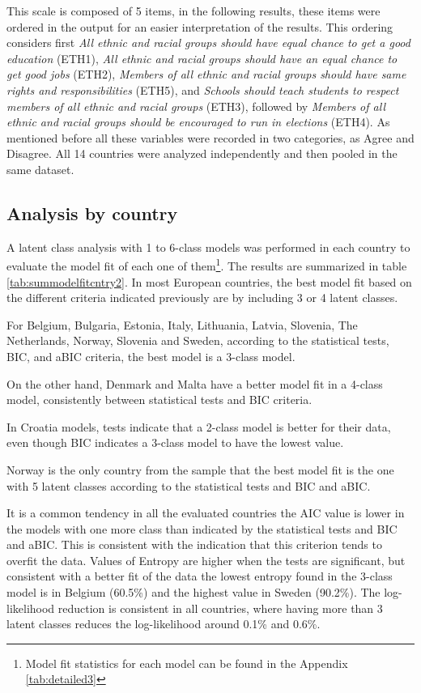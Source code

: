\documentclass[12pt,a4paper,oneside]{reedthesis}
\begin{document}
This scale is composed of 5 items, in the following results, these items were ordered in the output for an easier interpretation of the results. This ordering considers first \emph{All ethnic and racial groups should have equal chance to get a good education} (ETH1), \emph{All ethnic and racial groups should have an equal chance to get good jobs} (ETH2), \emph{Members of all ethnic and racial groups should have same rights and responsibilities} (ETH5), and \emph{Schools should teach students to respect members of all ethnic and racial groups} (ETH3), followed by \emph{Members of all ethnic and racial groups should be encouraged to run in elections} (ETH4). As mentioned before all these variables were recorded in two categories, as Agree and Disagree. All 14 countries were analyzed independently and then pooled in the same dataset.

\hypertarget{analysis-by-country-1}{%
\subsection{Analysis by country}\label{analysis-by-country-1}}

A latent class analysis with 1 to 6-class models was performed in each country to evaluate the model fit of each one of them\footnote{Model fit statistics for each model can be found in the Appendix \ref{tab:detailed3}}. The results are summarized in table \ref{tab:summodelfitcntry2}. In most European countries, the best model fit based on the different criteria indicated previously are by including 3 or 4 latent classes.

For Belgium, Bulgaria, Estonia, Italy, Lithuania, Latvia, Slovenia, The Netherlands, Norway, Slovenia and Sweden, according to the statistical tests, BIC, and aBIC criteria, the best model is a 3-class model.

On the other hand, Denmark and Malta have a better model fit in a 4-class model, consistently between statistical tests and BIC criteria.

In Croatia models, tests indicate that a 2-class model is better for their data, even though BIC indicates a 3-class model to have the lowest value.

Norway is the only country from the sample that the best model fit is the one with 5 latent classes according to the statistical tests and BIC and aBIC.

It is a common tendency in all the evaluated countries the AIC value is lower in the models with one more class than indicated by the statistical tests and BIC and aBIC. This is consistent with the indication that this criterion tends to overfit the data. Values of Entropy are higher when the tests are significant, but consistent with a better fit of the data the lowest entropy found in the 3-class model is in Belgium (60.5\%) and the highest value in Sweden (90.2\%). The log-likelihood reduction is consistent in all countries, where having more than 3 latent classes reduces the log-likelihood around 0.1\% and 0.6\%.
\end{document}
